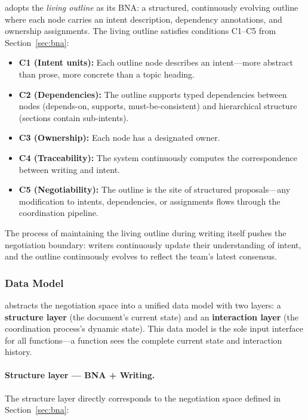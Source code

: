 \system{} adopts the \emph{living outline} as its BNA: a structured, continuously evolving outline where each node carries an intent description, dependency annotations, and ownership assignments. The living outline satisfies conditions C1--C5 from Section~\ref{sec:bna}:

\begin{itemize}[leftmargin=1.5em, itemsep=1pt]
\item \textbf{C1 (Intent units):} Each outline node describes an intent---more abstract than prose, more concrete than a topic heading.
\item \textbf{C2 (Dependencies):} The outline supports typed dependencies between nodes (depends-on, supports, must-be-consistent) and hierarchical structure (sections contain sub-intents).
\item \textbf{C3 (Ownership):} Each node has a designated owner.
\item \textbf{C4 (Traceability):} The system continuously computes the correspondence between writing and intent.
\item \textbf{C5 (Negotiability):} The outline is the site of structured proposals---any modification to intents, dependencies, or assignments flows through the coordination pipeline.
\end{itemize}

\noindent The process of maintaining the living outline during writing itself pushes the negotiation boundary: writers continuously update their understanding of intent, and the outline continuously evolves to reflect the team's latest consensus.


\subsubsection{Data Model}
\label{sec:data-model}

\system{} abstracts the negotiation space into a unified data model with two layers: a \textbf{structure layer} (the document's current state) and an \textbf{interaction layer} (the coordination process's dynamic state). This data model is the sole input interface for all functions---a function sees the complete current state and interaction history.

\paragraph{Structure layer --- BNA + Writing.} The structure layer directly corresponds to the negotiation space defined in Section~\ref{sec:bna}:

